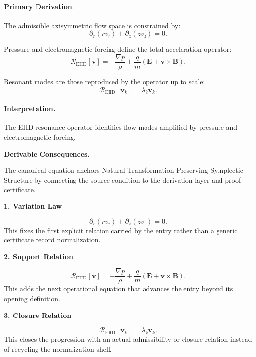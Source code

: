 \paragraph{Primary Derivation.}
The admissible axisymmetric flow space is constrained by:
\begin{equation}
\partial_r(rv_r)+\partial_z(zv_z)=0.
\end{equation}

Pressure and electromagnetic forcing define the total acceleration operator:
\begin{equation}
\mathcal{R}_{\mathrm{EHD}}[\mathbf{v}]
=
-\frac{\nabla p}{\rho}
+
\frac{q}{m}
(\mathbf{E}+\mathbf{v}\times\mathbf{B}).
\end{equation}

Resonant modes are those reproduced by the operator up to scale:
\begin{equation}
\boxed{
\mathcal{R}_{\mathrm{EHD}}[\mathbf{v}_k]
=
\lambda_k\mathbf{v}_k.
}
\end{equation}

\paragraph{Interpretation.}
The EHD resonance operator identifies flow modes amplified by pressure and electromagnetic forcing.

\par\vspace{0.35em}
\noindent\textbf{Derivable Consequences.}\quad
\begingroup
\footnotesize
\raggedright
The canonical equation anchors Natural Transformation Preserving Symplectic Structure by connecting the source condition to the derivation layer and proof certificate.
\par\endgroup

\noindent\textbf{1. Variation Law}\par
\[
\partial_r(rv_r)+\partial_z(zv_z)=0.
\]
\noindent This fixes the first explicit relation carried by the entry rather than a generic certificate record normalization.\par
\noindent\textbf{2. Support Relation}\par
\[
\mathcal{R}_{\mathrm{EHD}}[\mathbf{v}] = -\frac{\nabla p}{\rho} + \frac{q}{m} (\mathbf{E}+\mathbf{v}\times\mathbf{B}).
\]
\noindent This adds the next operational equation that advances the entry beyond its opening definition.\par
\noindent\textbf{3. Closure Relation}\par
\[
\mathcal{R}_{\mathrm{EHD}}[\mathbf{v}_k] = \lambda_k\mathbf{v}_k.
\]
\noindent This closes the progression with an actual admissibility or closure relation instead of recycling the normalization shell.\par

